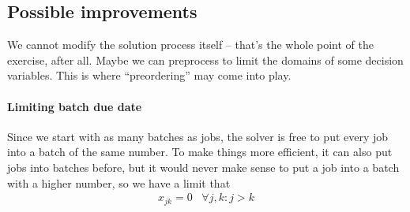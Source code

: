 \documentclass[12pt, landscape]{article}
\begin{document}
\subsection{Possible improvements}
We cannot modify the solution process itself -- that's the whole point of the exercise, after all. Maybe we can preprocess to limit the domains of some decision variables. This is where ``preordering'' may come into play.
\paragraph{Limiting batch due date}
Since we start with as many batches as jobs, the solver is free to put every job into a batch of the same number. To make things more efficient, it can also put jobs into batches before, but it would never make sense to put a job into a batch with a higher number, so we have a limit that
\begin{align}
  x_{jk} = 0 \;\;\; \forall j,k: j > k
\end{align}
\end{document}
